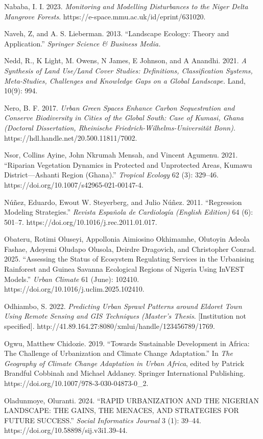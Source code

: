 Nababa, I. I. 2023. \emph{Monitoring and Modelling Disturbances to the Niger Delta Mangrove Forests}. https://e-space.mmu.ac.uk/id/eprint/631020.

Naveh, Z, and A. S. Lieberman. 2013. ``Landscape Ecology: Theory and Application.'' \emph{Springer Science \& Business Media.}

Nedd, R., K Light, M. Owens, N James, E Johnson, and A Anandhi. 2021. \emph{A Synthesis of Land Use/Land Cover Studies: Definitions, Classification Systems, Meta-Studies, Challenges and Knowledge Gaps on a Global Landscape.} Land, 10(9): 994.

Nero, B. F. 2017. \emph{Urban Green Spaces Enhance Carbon Sequestration and Conserve Biodiversity in Cities of the Global South: Case of Kumasi, Ghana (Doctoral Dissertation, Rheinische Friedrich-Wilhelms-Universität Bonn).} https://hdl.handle.net/20.500.11811/7002.

Nsor, Collins Ayine, John Nkrumah Mensah, and Vincent Agumenu. 2021. ``Riparian Vegetation Dynamics in Protected and Unprotected Areas, Kumawu District---Ashanti Region (Ghana).'' \emph{Tropical Ecology} 62 (3): 329--46. https://doi.org/10.1007/s42965-021-00147-4.

Núñez, Eduardo, Ewout W. Steyerberg, and Julio Núñez. 2011. ``Regression Modeling Strategies.'' \emph{Revista Española de Cardiología (English Edition)} 64 (6): 501--7. https://doi.org/10.1016/j.rec.2011.01.017.

Obateru, Rotimi Oluseyi, Appollonia Aimiosino Okhimamhe, Olutoyin Adeola Fashae, Adeyemi Oludapo Olusola, Deirdre Dragovich, and Christopher Conrad. 2025. ``Assessing the Status of Ecosystem Regulating Services in the Urbanising Rainforest and Guinea Savanna Ecological Regions of Nigeria Using InVEST Models.'' \emph{Urban Climate} 61 (June): 102410. https://doi.org/10.1016/j.uclim.2025.102410.

Odhiambo, S. 2022. \emph{Predicting Urban Sprawl Patterns around Eldoret Town Using Remote Sensing and GIS Techniques (Master's Thesis}. {[}Institution not specified{]}. http://41.89.164.27:8080/xmlui/handle/123456789/1769.

Ogwu, Matthew Chidozie. 2019. ``Towards Sustainable Development in Africa: The Challenge of Urbanization and Climate Change Adaptation.'' In \emph{The Geography of Climate Change Adaptation in Urban Africa}, edited by Patrick Brandful Cobbinah and Michael Addaney. Springer International Publishing. https://doi.org/10.1007/978-3-030-04873-0\_2.

Oladunmoye, Oluranti. 2024. ``RAPID URBANIZATION AND THE NIGERIAN LANDSCAPE: THE GAINS, THE MENACES, AND STRATEGIES FOR FUTURE SUCCESS.'' \emph{Social Informatics Journal} 3 (1): 39--44. https://doi.org/10.58898/sij.v3i1.39-44.


